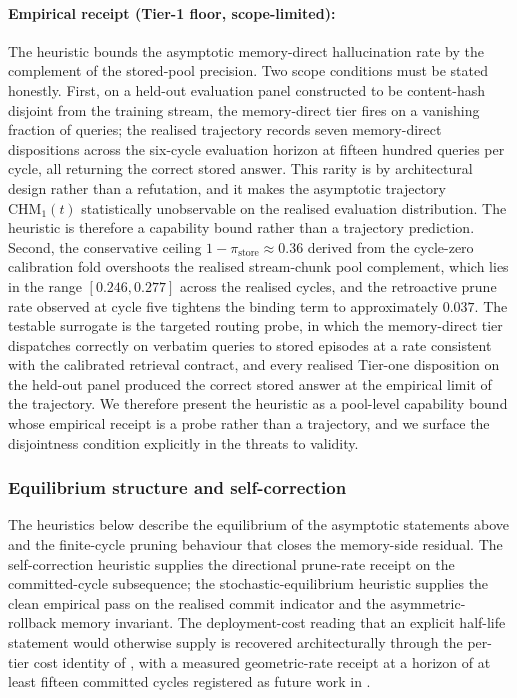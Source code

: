 \paragraph{Empirical receipt (Tier-1 floor, scope-limited):} The heuristic bounds the asymptotic memory-direct hallucination rate by the complement of the stored-pool precision. Two scope conditions must be stated honestly. First, on a held-out evaluation panel constructed to be content-hash disjoint from the training stream, the memory-direct tier fires on a vanishing fraction of queries; the realised trajectory records seven memory-direct dispositions across the six-cycle evaluation horizon at fifteen hundred queries per cycle, all returning the correct stored answer. This rarity is by architectural design rather than a refutation, and it makes the asymptotic trajectory $\mathrm{CHM}_{1}(t)$ statistically unobservable on the realised evaluation distribution. The heuristic is therefore a capability bound rather than a trajectory prediction. Second, the conservative ceiling $1-\pi_{\text{store}}\approx 0.36$ derived from the cycle-zero calibration fold overshoots the realised stream-chunk pool complement, which lies in the range $[0.246, 0.277]$ across the realised cycles, and the retroactive prune rate observed at cycle five tightens the binding term to approximately $0.037$. The testable surrogate is the targeted routing probe, in which the memory-direct tier dispatches correctly on verbatim queries to stored episodes at a rate consistent with the calibrated retrieval contract, and every realised Tier-one disposition on the held-out panel produced the correct stored answer at the empirical limit of the trajectory. We therefore present the heuristic as a pool-level capability bound whose empirical receipt is a probe rather than a trajectory, and we surface the disjointness condition explicitly in the threats to validity.

\subsubsection{Equilibrium structure and self-correction}
\label{sec:theorem-corollaries}

The heuristics below describe the equilibrium of the asymptotic statements above and the finite-cycle pruning behaviour that closes the memory-side residual. The self-correction heuristic supplies the directional prune-rate receipt on the committed-cycle subsequence; the stochastic-equilibrium heuristic supplies the clean empirical pass on the realised commit indicator and the asymmetric-rollback memory invariant. The deployment-cost reading that an explicit half-life statement would otherwise supply is recovered architecturally through the per-tier cost identity of , with a measured geometric-rate receipt at a horizon of at least fifteen committed cycles registered as future work in .

